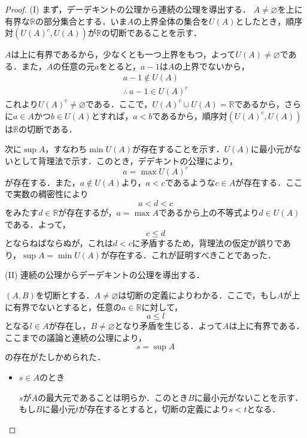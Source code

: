 \documentclass[dvipdfmx,uplatex,11pt]{jsarticle}
\theoremstyle{definition}
\begin{document}
\begin{leftbar}
    \begin{proof}
        (I) \quad まず，デーデキントの公理から連続の公理を導出する．
        $A \ne \varnothing$を上に有界な$\mathbb{R}$の部分集合とする．いま$A$の上界全体の集合を$U(A)$としたとき，順序対$({U(A)}^c , U(A))$が$\mathbb{R}$の切断であることを示す．\par 
        $A$は上に有界であるから，少なくとも一つ上界をもつ，よって$U(A) \ne \varnothing$である．また，$A$の任意の元$a$をとると，$a-1$は$A$の上界でないから，
        \begin{gather*}
            a -1 \notin U(A) \\
            \therefore ~ a-1 \in  {U(A)}^c
        \end{gather*}
        これより${U(A)}^c \ne \varnothing$である．ここで，${U(A)}^c \cup U(A)= \mathbb{R}$であるから，さらに$a \in A$かつ$ b \in U(A)$とすれば，$a<b$であるから，順序対$({U(A)}^c , U(A))$は$\mathbb{R}$の切断である．\par 
        次に$\sup A$，すなわち$ \min U(A)$が存在することを示す．$U(A)$に最小元がないとして背理法で示す．このとき，デデキントの公理により，
        \[
        a = \max {U(A)}^c
        \]
        が存在する．また，$a \notin U(A)$より，$a<c$であるような$c \in A$が存在する．ここで実数の稠密性により
        \[
            a<d<c
        \]
        をみたす$d \in \mathbb{R}$が存在するが，$a = \max A$であるから上の不等式より$d \in U(A)$である．よって，
        \[
            c \le d
        \]
        とならねばならぬが，これは$d<c$に矛盾するため，背理法の仮定が誤りであり，$ \sup A = \min U(A)$が存在する．これが証明すべきことであった．\\
        \par 
        (II) \quad 連続の公理からデーデキントの公理を導出する．\par 
        $(A,B)$を切断とする．$A \ne \varnothing$は切断の定義によりわかる．ここで，もし$A$が上に有界でないとすると，任意の$ a \in \mathbb{R}$に対して，
        \[
            a \le l
        \]
        となる$l \in A$が存在し，$B \ne \varnothing$となり矛盾を生じる．よって$A$は上に有界である．ここまでの議論と連続の公理により，
        \[
            s = \sup A
        \]
        の存在がたしかめられた．
        \begin{itemize}
            \item $ s \in A$のとき\par 
            $s$が$A$の最大元であることは明らか．このとき$B$に最小元がないことを示す．もし$B$に最小元$t$が存在するとすると，切断の定義により$ s < t$となる．

\end{itemize}
\end{proof}
\end{leftbar}
\end{document}
